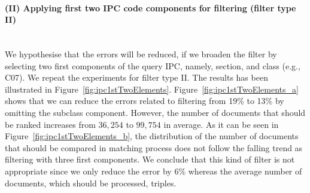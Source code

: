 \paragraph{(II) Applying first two IPC code components for filtering (filter type II)}
\ \\
We hypothesise that the errors will be reduced, if we broaden the filter by selecting two first components of the query IPC, namely, section, and class (e.g., C07). We repeat the experiments for filter type II.
The results has been illustrated in Figure~\ref{fig:ipc1stTwoElements}. Figure~\ref{fig:ipc1stTwoElements_a} shows that we can reduce the errors related to filtering from 19\% to 13\% by omitting the subclass component. However, the number of documents that should be ranked increases from $ 36,254 $ to $ 99,754 $ in average. As it can be seen in Figure~\ref{fig:ipc1stTwoElements_b}, the distribution of the number of documents that should be compared in matching process does not follow the falling trend as filtering with three first components. We conclude that this kind of filter is not appropriate since we only reduce the error by 6\% whereas the average number of documents, which should be processed, triples.    
